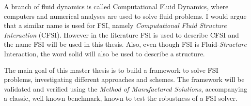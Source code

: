 A branch of fluid dynamics is called Computational Fluid Dynamics, where computers and numerical analyses are used to solve fluid problems.
I would argue that a similar name is used for FSI, namely \textit{Computational Fluid Structure Interaction} (CFSI). However in the literature FSI is used to describe CFSI and the name FSI will be used in this thesis. Also, even though FSI is Fluid-\textit{Structure} Interaction, the word solid will also be used to describe a structure. \newline

The main goal of this master thesis is to build a framework to solve FSI problems, investigating different approaches and schemes. The framework will be validated and verified using the \textit{Method of Manufactured Solutions}, accompanying a classic, well known benchmark, known to test the robustness of a FSI solver.


